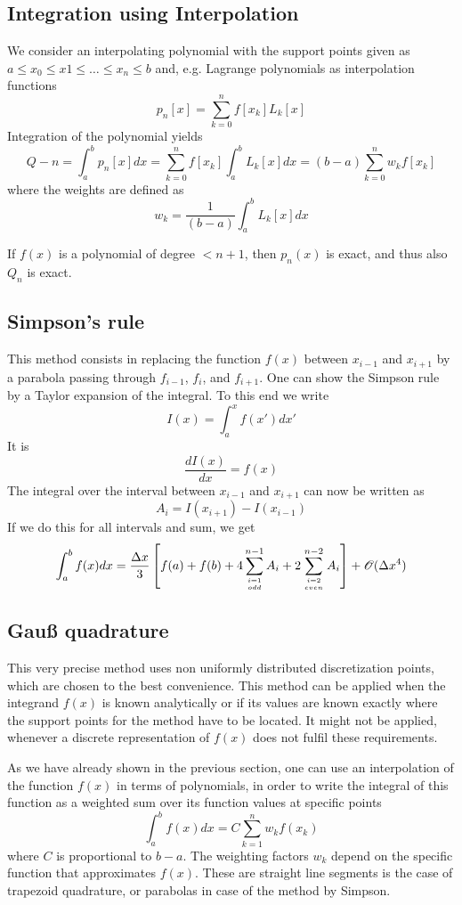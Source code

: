 \subsection{Integration using Interpolation}
We consider an interpolating polynomial with the support points given as
$a\le x_0\le x1\le\dots\le x_n\le b$
and, e.g. Lagrange polynomials as interpolation functions
\[ p_n[x]=\sum_{k=0}^nf[x_k]L_k[x]\]
Integration of the polynomial yields
\[ Q-n=\int_a^bp_n[x]dx=\sum_{k=0}^nf[x_k]\int_a^bL_k[x]dx=(b-a)\sum_{k=0}^nw_kf[x_k] \]
where the weights are defined as
\[ w_k=\frac{1}{(b-a)}\int_a^bL_k[x]dx\]

\begin{note}{}
If $f(x)$ is a polynomial of degree $<n+1$, then $p_n(x)$ is exact, and thus
also $Q_n$ is exact.
\end{note}
\subsection{Simpson's rule}
This method consists in replacing the function $f(x)$ between $x_{i-1}$ and
$x_{i+1}$ by a parabola passing through $f_{i-1}$, $f_i$, and $f_{i+1}$. One
can show the Simpson rule by a Taylor expansion of the integral. To this end we
write
\[ I(x)=\int_a^x f(x')dx'\]
It is
\[ \frac{dI(x)}{dx}=f(x)\]
The integral over the interval between $x_{i-1}$ and $x_{i+1}$ can now be written as
\[ A_i =I(x_{i+1})-I(x_{i-1})\]
If we do this for all intervals and sum, we get
\[\int_a^bf(x)dx=\frac{\Delta x}{3}\left[f(a)+f(b)+4\sum_{ {i=1}\atop {odd}}^{n-1}
A_i+2 \sum_{ {i=2}\atop {even}}^{n-2}A_i\right]+{\cal O}(\Delta x^4)\]

\subsection{Gau{\ss} quadrature}
This very precise method uses non uniformly distributed discretization points,
which are chosen to the best convenience. This method can be applied when the
integrand $f(x)$ is known analytically or if its values are known exactly where
the support points for the method have to be located. It might not be applied,
whenever a discrete representation of $f(x)$ does not fulfil these
requirements.

As we have already shown in the previous section, one can use an interpolation
of the function $f(x)$ in terms of polynomials, in order to write the integral
of this function as a weighted sum over its function values at specific points
\[ \int_{a}^{b}f(x)dx=C\sum_{k=1}^nw_kf(x_k)\]
where $C$ is proportional to $b-a$. The weighting factors $w_k$ depend on the
specific function that approximates $f(x)$. These are straight line segments is
the case of trapezoid quadrature, or parabolas in case of the method by
Simpson.

